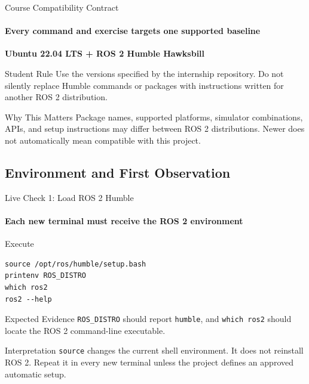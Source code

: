 \begin{frame}{Course Compatibility Contract}
\framesubtitle{Every command and exercise targets one supported baseline}
\begin{center}
\Large\textbf{Ubuntu 22.04 LTS + ROS 2 Humble Hawksbill}
\end{center}
\begin{block}{Student Rule}
Use the versions specified by the internship repository. Do not silently replace Humble commands or packages with instructions written for another ROS 2 distribution.
\end{block}
\begin{alertblock}{Why This Matters}
Package names, supported platforms, simulator combinations, APIs, and setup instructions may differ between ROS 2 distributions. Newer does not automatically mean compatible with this project.
\end{alertblock}
\end{frame}

\subsection{Environment and First Observation}

\begin{frame}[fragile]{Live Check 1: Load ROS 2 Humble}
\framesubtitle{Each new terminal must receive the ROS 2 environment}
\begin{block}{Execute}
\begin{verbatim}
source /opt/ros/humble/setup.bash
printenv ROS_DISTRO
which ros2
ros2 --help
\end{verbatim}
\end{block}
\begin{exampleblock}{Expected Evidence}
\texttt{ROS\_DISTRO} should report \texttt{humble}, and \texttt{which ros2} should locate the ROS 2 command-line executable.
\end{exampleblock}
\begin{alertblock}{Interpretation}
\texttt{source} changes the current shell environment. It does not reinstall ROS 2. Repeat it in every new terminal unless the project defines an approved automatic setup.
\end{alertblock}
\end{frame}

